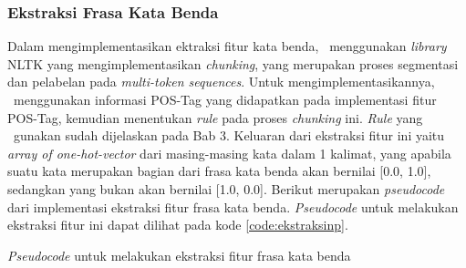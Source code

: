\subsubsection{Ekstraksi Frasa Kata Benda}
Dalam mengimplementasikan ektraksi fitur kata benda, \saya~menggunakan \textit{library} NLTK \citep{bird2009nltk} yang mengimplementasikan \textit{chunking}, yang merupakan proses segmentasi dan pelabelan pada \textit{multi-token sequences}. Untuk mengimplementasikannya, \saya~menggunakan informasi POS-Tag yang didapatkan pada implementasi fitur POS-Tag, kemudian menentukan \textit{rule} pada proses \textit{chunking} ini. \textit{Rule} yang \saya~gunakan sudah dijelaskan pada Bab 3. Keluaran dari ekstraksi fitur ini yaitu \textit{array of one-hot-vector} dari masing-masing kata dalam 1 kalimat, yang apabila suatu kata merupakan bagian dari frasa kata benda akan bernilai [0.0, 1.0], sedangkan yang bukan akan bernilai [1.0, 0.0]. Berikut merupakan \textit{pseudocode} dari implementasi ekstraksi fitur frasa kata benda. \textit{Pseudocode} untuk melakukan ekstraksi fitur ini dapat dilihat pada kode \ref{code:ekstraksinp}.

\begin{kode}

	
	\SetAlgoLined
	\BlankLine
	
	\BlankLine	
	\caption{\textit{Pseudocode} untuk melakukan ekstraksi fitur frasa kata benda}
	\label{code:ekstraksinp}	
\end{kode}

